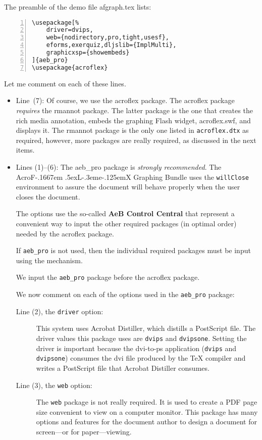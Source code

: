 \documentclass{article}
\makeatletter
\let\pkg\textsf
\let\app\textsf
\def\AcroFLeX{AcroF\kern-.1667em
    \lower.5ex\hbox{L}\kern-.3eme\kern-.125emX\@}
\let\amtIndent\leftmargini
\makeatother
\begin{document}
The preamble of the demo file afgraph.tex lists:
\begin{Verbatim}[xleftmargin=\amtIndent,numbers=left]
\usepackage[%
    driver=dvips,
    web={nodirectory,pro,tight,usesf},
    eforms,exerquiz,dljslib={ImplMulti},
    graphicxsp={showembeds}
]{aeb_pro}
\usepackage{acroflex}
\end{Verbatim}
Let me comment on each of these lines.
\begin{itemize}
  \item Line~(7): Of course, we use the \pkg{acroflex} package. The
      \pkg{acroflex} package \textit{requires} the \pkg{rmannot} package.
      The latter package is the one that creates the rich media annotation,
      embeds the graphing Flash widget, acroflex.swf, and displays it. The
      \pkg{rmannot} package is the only one listed in \texttt{acroflex.dtx}
      as required, however, more packages are really required, as discussed
      in the next items.

  \item Lines (1)--(6): The \pkg{aeb\_pro} package is \textit{strongly
      recommended}. The {\AcroFLeX} Graphing Bundle uses the
      \texttt{willClose} environment to assure the document will behave
      properly when the user closes the document.

  The options use the so-called \textbf{AeB Control Central} that represent
  a convenient way to input the other required packages (in optimal order)
  needed by the \pkg{acroflex} package.

  If \texttt{aeb\_pro} is not used, then the individual
  required packages must be input using the 
  mechanism.

  We input the \texttt{aeb\_pro} package before the
  \pkg{acroflex} package.

  We now comment on each of the options used in the \texttt{aeb\_pro}
  package:
  \begin{description}
    \item[Line (2), the \texttt{driver} option:] This system uses \app{Acrobat
        Distiller}, which distills a PostScript file. The driver values
        this package uses are \texttt{dvips} and \texttt{dvipsone}.
        Setting the driver is important because the dvi-to-ps application
        (\texttt{dvips} and \texttt{dvipsone}) consumes the dvi file
        produced by the {\TeX} compiler and writes a PostScript file that
        Acrobat Distiller consumes.

    \item [Line (3), the \texttt{web} option:] The \texttt{web} package
        is not really required. It is used to create a PDF page size
        convenient to view on a computer monitor. This package has many
        options and features for the document author to design a document
        for screen---or for paper---viewing.


\end{description}
\end{itemize}
\end{document}
